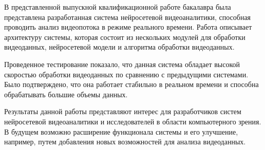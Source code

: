 \conclusion

В представленной выпускной квалификационной работе бакалавра была представлена разработанная система нейросетевой видеоаналитики, способная проводить анализ видеопотока в режиме реального времени. Работа описывает архитектуру системы, которая состоит из нескольких модулей для обработки видеоданных, нейросетевой модели и алгоритма обработки видеоданных.

Проведенное тестирование показало, что данная система обладает высокой скоростью обработки видеоданных по сравнению с предыдущими системами. Было подтверждено, что она работает стабильно в реальном времени и способна обрабатывать большие объемы данных.

Результаты данной работы представляют интерес для разработчиков систем нейросетевой видеоаналитики и исследователей в области компьютерного зрения. В будущем возможно расширение функционала системы и его улучшение, например, путем добавления новых возможностей для анализа видеоданных.